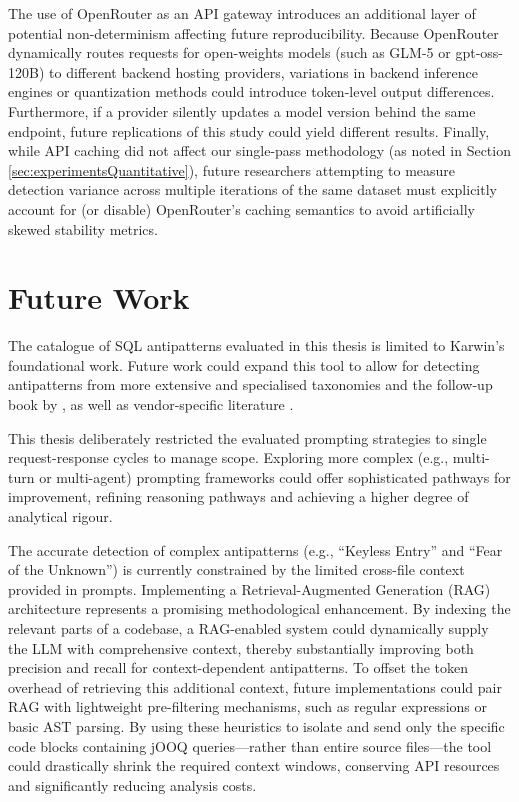 The use of OpenRouter as an API gateway introduces an additional layer of potential non-determinism affecting future reproducibility. Because OpenRouter dynamically routes requests for open-weights models (such as GLM-5 or gpt-oss-120B) to different backend hosting providers, variations in backend inference engines or quantization methods could introduce token-level output differences. Furthermore, if a provider silently updates a model version behind the same endpoint, future replications of this study could yield different results. Finally, while API caching did not affect our single-pass methodology (as noted in Section \ref{sec:experimentsQuantitative}), future researchers attempting to measure detection variance across multiple iterations of the same dataset must explicitly account for (or disable) OpenRouter's caching semantics to avoid artificially skewed stability metrics.

\section{Future Work}\label{sec:futureWork}

The catalogue of SQL antipatterns evaluated in this thesis is limited to Karwin's foundational work. Future work could expand this tool to allow for detecting antipatterns from more extensive and specialised taxonomies  and the follow-up book by , as well as vendor-specific literature .

This thesis deliberately restricted the evaluated prompting strategies to single request-response cycles to manage scope. Exploring more complex (e.g., multi-turn or multi-agent) prompting frameworks could offer sophisticated pathways for improvement, refining reasoning pathways and achieving a higher degree of analytical rigour.

The accurate detection of complex antipatterns (e.g., “Keyless Entry” and “Fear of the Unknown”) is currently constrained by the limited cross-file context provided in prompts. Implementing a Retrieval-Augmented Generation (RAG) architecture represents a promising methodological enhancement. By indexing the relevant parts of a codebase, a RAG-enabled system could dynamically supply the LLM with comprehensive context, thereby substantially improving both precision and recall for context-dependent antipatterns. To offset the token overhead of retrieving this additional context, future implementations could pair RAG with lightweight pre-filtering mechanisms, such as regular expressions or basic AST parsing. By using these heuristics to isolate and send only the specific code blocks containing jOOQ queries—rather than entire source files—the tool could drastically shrink the required context windows, conserving API resources and significantly reducing analysis costs.

